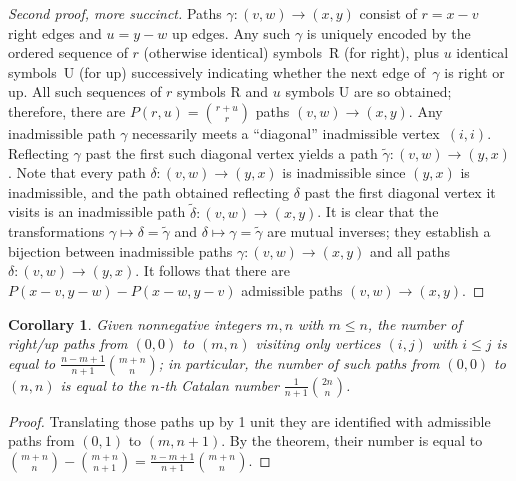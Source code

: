 \documentclass[11pt,letterpaper]{amsart}
\theoremstyle{plain}
\newtheorem*{corollary}{Corollary}
\theoremstyle{definition}
\begin{document}
\begin{proof}[Second proof, more succinct]
  Paths $\gamma:(v,w)\to(x,y)$ consist of $r = x-v$ right edges and $u = y-w$ up edges.
  Any such $\gamma$ is uniquely encoded by the ordered sequence of $r$ (otherwise identical) symbols~R (for right), plus $u$ identical symbols~U (for up) successively indicating whether the next edge of~$\gamma$ is right or up.
  All such sequences of $r$ symbols R and $u$ symbols U are so obtained;
  therefore, there are $P(r,u) = \binom{r+u}{r}$ paths $(v,w)\to(x,y)$.
  Any inadmissible path $\gamma$ necessarily meets a ``diagonal'' inadmissible vertex~$(i,i)$.
  Reflecting $\gamma$ past the first such diagonal vertex yields a path $\widetilde{\gamma}:(v,w)\to(y,x)$.
  Note that every path $\delta:(v,w)\to(y,x)$ is inadmissible since $(y,x)$ is inadmissible, and the path obtained reflecting $\delta$ past the first diagonal vertex it visits is an inadmissible path $\widetilde{\delta} : (v,w)\to(x,y)$.
  It is clear that the transformations $\gamma\mapsto \delta=\widetilde{\gamma}$ and $\delta\mapsto \gamma=\widetilde{\gamma}$ are mutual inverses;
  they establish a bijection between inadmissible paths $\gamma:(v,w)\to(x,y)$ and all paths $\delta : (v,w)\to(y,x)$.
  It follows that there are $P(x-v,y-w) - P(x-w,y-v)$ admissible paths $(v,w)\to(x,y)$.
\end{proof}

\begin{corollary}
  Given nonnegative integers $m,n$ with $m\le n$, the number of right/up paths from $(0,0)$ to $(m,n)$ visiting only vertices $(i,j)$ with $i\le j$ is equal to $\frac{n-m+1}{n+1}\binom{m+n}{n}$;
  in particular, the number of such paths from $(0,0)$ to $(n,n)$ is equal to the $n$-th Catalan number $\frac{1}{n+1}\binom{2n}{n}$.
\end{corollary}
\begin{proof}
  Translating those paths up by 1 unit they are identified with admissible paths from $(0,1)$ to $(m,n+1)$.
  By the theorem, their number is equal to $\binom{m+n}{n} - \binom{m+n}{n+1} = \frac{n-m+1}{n+1}\binom{m+n}{n}$.
\end{proof}
\end{document}
